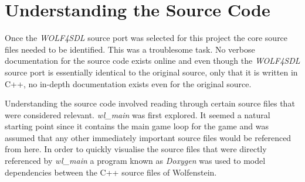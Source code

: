 \documentclass[]{Learning-to-Play-Wolfenstein-thesis}
\begin{document}
\section{\label{section3.2}Understanding the Source Code}
Once the \textit{WOLF4SDL} source port was selected for this project the core source files needed to be identified. This was a troublesome task. No verbose documentation for the source code exists online and even though the \textit{WOLF4SDL} source port is essentially identical to the original source, only that it is written in C++, no in-depth documentation exists even for the original source. 

Understanding the source code involved reading through certain source files that were considered relevant. \textit{wl\_main} was first explored. It seemed a natural starting point since it contains the main game loop for the game and was assumed that any other immediately important source files would be referenced from here. In order to quickly visualise the source files that were directly referenced by \textit{wl\_main} a program known as \textit{Doxygen} was used to model dependencies between the C++ source files of Wolfenstein.  
\end{document}
